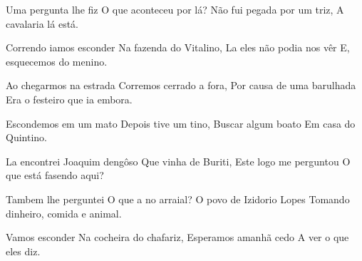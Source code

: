 \documentclass{article}
\begin{document}
\begin{poem}
	\begin{stanza}
    Uma pergunta lhe fiz        \verseline
    O que aconteceu por lá?     \verseline
    Não fui pegada por um triz, \verseline
    A cavalaria lá está.
  \end{stanza}
\end{poem}

\begin{poem}
	\begin{stanza}
    Correndo iamos esconder   \verseline
    Na fazenda do Vitalino,   \verseline
    La eles não podia nos vêr \verseline
    E, esquecemos do menino.
  \end{stanza}
\end{poem}

\begin{poem}
	\begin{stanza}
    Ao chegarmos na estrada    \verseline
    Corremos cerrado a fora,   \verseline
    Por causa de uma barulhada \verseline
    Era o festeiro que ia embora.
  \end{stanza}
\end{poem}

\begin{poem}
	\begin{stanza}
    Escondemos em um mato \verseline
    Depois tive um tino,  \verseline
    Buscar algum boato    \verseline
    Em casa do Quintino.
  \end{stanza}
\end{poem}

\begin{poem}
	\begin{stanza}
    La encontrei Joaquim dengôso \verseline
    Que vinha de Buriti,         \verseline
    Este logo me perguntou       \verseline
    O que está fasendo aqui?
  \end{stanza}
\end{poem}

\begin{poem}
	\begin{stanza}
    Tambem lhe perguntei     \verseline
    O que a no arraial?      \verseline
    O povo de Izidorio Lopes \verseline
    Tomando dinheiro, comida e animal.
  \end{stanza}
\end{poem}

\begin{poem}
	\begin{stanza}
    Vamos esconder           \verseline
    Na cocheira do chafariz, \verseline
    Esperamos amanhã cedo    \verseline
    A ver o que eles diz.
  \end{stanza}
\end{poem}
\end{document}
